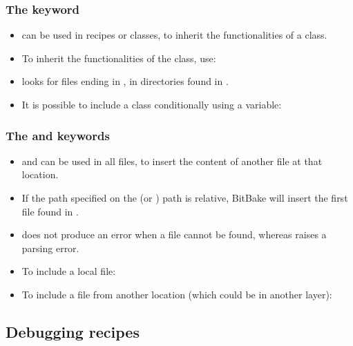 \begin{frame}
  \frametitle{The  keyword}
  \begin{itemize}
    \item {} can be used in recipes or classes, to inherit
      the functionalities of a class.
    \item To inherit the functionalities of the  class,
      use: 
    \item {} looks for files ending in , in
       directories found in .
    \item It is possible to include a class conditionally using a
      variable: 
  \end{itemize}
\end{frame}

\begin{frame}
  \frametitle{The  and  keywords}
  \begin{itemize}
    \item {} and  can be used in all files,
      to insert the content of another file at that location.
    \item If the path specified on the  (or
      ) path is relative, BitBake will insert the first
      file found in .
    \item {} does not produce an error when a file cannot
      be found, whereas  raises a parsing error.
    \item To include a local file: 
    \item To include a file from another location (which could be
      in another layer): 
  \end{itemize}
\end{frame}

\subsection{Debugging recipes}


